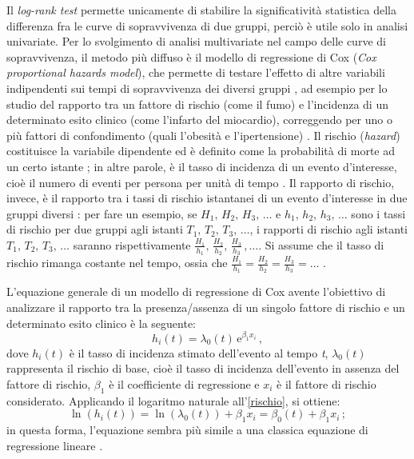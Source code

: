 Il \textit{log-rank test} permette unicamente di stabilire la significatività statistica della differenza fra le curve di sopravvivenza di due gruppi, perciò è utile solo in analisi univariate. Per lo svolgimento di analisi multivariate nel campo delle curve di sopravvivenza, il metodo più diffuso è il modello di regressione di Cox (\textit{Cox proportional hazards model}), che permette di testare l'effetto di altre variabili indipendenti sui tempi di sopravvivenza dei diversi gruppi \cite{Goel2010}, ad esempio per lo studio del rapporto tra un fattore di rischio (come il fumo) e l’incidenza di un determinato esito clinico (come l'infarto del miocardio), correggendo per uno o più fattori di confondimento (quali l’obesità e l’ipertensione) \cite{Provenzano2013}. Il rischio (\textit{hazard}) costituisce la variabile dipendente ed è definito come la probabilità di morte ad un certo istante \cite{Goel2010}; in altre parole, è il tasso di incidenza di un evento d'interesse, cioè il numero di eventi per persona per unità di tempo \cite{Provenzano2013}. Il rapporto di rischio, invece, è il rapporto tra i tassi di rischio istantanei di un evento d'interesse in due gruppi diversi \cite{wiki:rischio}: per fare un esempio, se $H_1,\,H_2,\,H_3,\,\dots$ e $h_1,\,h_2,\,h_3,\,\dots$ sono i tassi di rischio per due gruppi agli istanti $T_1,\,T_2,\,T_3,\,\dots$, i rapporti di rischio agli istanti $T_1,\,T_2,\,T_3,\,\dots$ saranno rispettivamente $\frac{H_1}{h_1},\,\frac{H_2}{h_2},\,\frac{H_3}{h_3}\,,\dots$. Si assume che il tasso di rischio rimanga costante nel tempo, ossia che $\frac{H_1}{h_1}=\frac{H_2}{h_2}=\frac{H_3}{h_3}=\dots$ \cite{Goel2010}.

L’equazione generale di un modello di regressione di Cox avente
l’obiettivo di analizzare il rapporto tra la presenza/assenza di un singolo
fattore di rischio e un determinato esito clinico è la seguente:
\begin{equation}\label{rischio}
    h_i(t) = \lambda_0(t)\,\mathrm{e}^{\beta_1 x_i}\,,
\end{equation}
dove $h_i(t)$ è il tasso di incidenza stimato dell'evento al tempo \textit{t}, $\lambda_0(t)$ rappresenta il rischio di base, cioè il tasso di incidenza dell'evento in assenza del fattore di rischio, $\beta_1$ è il coefficiente di regressione e $x_i$ è il fattore di rischio considerato. Applicando il logaritmo naturale all'\eqref{rischio}, si ottiene:
\begin{equation}
    \ln{(h_i(t))} = \ln{(\lambda_0(t))} + \beta_1 x_i = \beta_0(t) + \beta_1 x_i\,;
\end{equation}
in questa forma, l'equazione sembra più simile a una classica equazione di regressione lineare \cite{Goel2010, vanDijk2008}.

